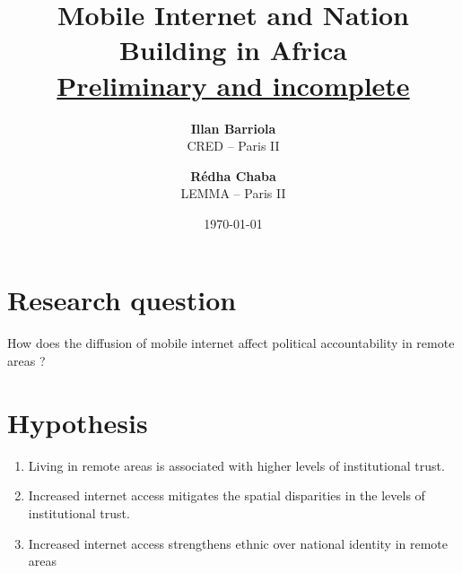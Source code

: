 \documentclass[11pt]{article}
\theoremstyle{plain}
\theoremstyle{plain}
\begin{document}
\title{Mobile Internet and Nation Building in Africa\\  \vspace{0.75cm} \underline{Preliminary and incomplete }}

\vspace{1cm}

\author{
\textbf{Illan Barriola} \\ CRED -- Paris II \\
\and \textbf{R\'{e}dha Chaba}\\ LEMMA -- Paris II \\
}

\date{ \today}

\maketitle

\section*{Research question}

How does the diffusion of mobile internet affect political accountability in remote areas ?
\section*{Hypothesis}
\begin{enumerate}
  \item Living in remote areas is associated with higher levels of institutional trust.
  \item Increased internet access mitigates the spatial disparities in the levels of institutional trust.
  \item Increased internet access strengthens ethnic over national identity in remote areas
\end{enumerate}
\end{document}
